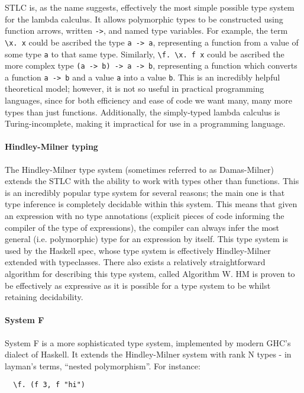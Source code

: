 \documentclass[9pt]{extarticle}
\begin{document}
STLC is, as the name suggests, effectively the most simple possible type
system for the lambda calculus. It allows polymorphic types to be
constructed using function arrows, written \verb'->', and named type
variables. For example, the term \verb'\x. x' could be ascribed the type
\verb'a -> a', representing a function from a value of some type
\verb'a' to that same type. Similarly, \verb'\f. \x. f x' could be
ascribed the more complex type \verb'(a -> b) -> a -> b', representing a
function which converts a function \verb'a -> b' and a value \verb'a'
into a value \verb'b'. This is an incredibly helpful theoretical model;
however, it is not so useful in practical programming languages, since
for both efficiency and ease of code we want many, many more types than
just functions. Additionally, the simply-typed lambda calculus is
Turing-incomplete, making it impractical for use in a programming
language.

\paragraph{Hindley-Milner typing}

The Hindley-Milner type system (sometimes referred to as Damas-Milner) extends
the STLC with the ability to work with types other than functions. This
is an incredibly popular type system for several reasons; the main one
is that type inference is completely decidable within this system.  This
means that given an expression with no type annotations (explicit pieces
of code informing the compiler of the type of expressions), the compiler
can always infer the most general (i.e.  polymorphic) type for an
expression by itself. This type system is used by the Haskell spec,
whose type system is effectively Hindley-Milner extended with
typeclasses. There also exists a relatively straightforward algorithm
for describing this type system, called Algorithm W. HM is proven to be
effectively as expressive as it is possible for a type system to be
whilst retaining decidability.

\paragraph{System F}

System F is a more sophisticated type system, implemented by modern GHC's
dialect of Haskell. It extends the Hindley-Milner system with rank N types - in
layman's terms, ``nested polymorphism''. For instance:

\begin{verbatim}
  \f. (f 3, f "hi")
\end{verbatim}
\end{document}
